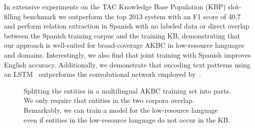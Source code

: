 In extensive experiments on the TAC Knowledge Base Population (KBP) slot-filling benchmark we outperform the top 2013 system with an F1 score of 40.7 and perform relation extraction in Spanish with no labeled data or direct overlap between the Spanish training corpus and the training KB, demonstrating that our approach is well-suited for broad-coverage AKBC in low-resource languages and domains. Interestingly, we also find that joint training with Spanish improves English accuracy. Additionally, we demonstrate that encoding text patterns using an LSTM~\citep{lstm} outperforms the convolutional network employed by~\citet{toutanova2015representing}.


\begin{figure}[h!]
\begin{center}
\vspace{-1.9069cm}

\def\firstcircle{(0,0) circle (1.5cm)}
\def\secondcircle{(0:2cm) circle (1.5cm)}
\def\midline{[line width=1pt, dashed] node[label={[label distance=-3cm]-15:in KB}] {} node[label={[label distance=-3.5cm]15:not in KB}] {} (-3,0) -- (5,0)}
\caption{Splitting the entities in a multilingual AKBC training set into parts. We only require that entities in the two corpora overlap. Remarkably, we can train a model for the low-resource language even if entities in the low-resource language do not occur in the KB. \label{tab:multilingual-corpora}}
\end{center}
\vspace{-.4cm}
\end{figure}

